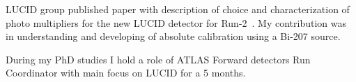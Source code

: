 LUCID group published paper with description of choice and characterization of photo multipliers for the new LUCID detector for Run-2~\cite{Alberghi:2016tad}.
My contribution was in understanding and developing of absolute calibration using a Bi-207 source.

During my PhD studies I hold a role of ATLAS Forward detectors Run Coordinator with main focus on LUCID for a 5 months.


% 
%  
% 
%  
%  
